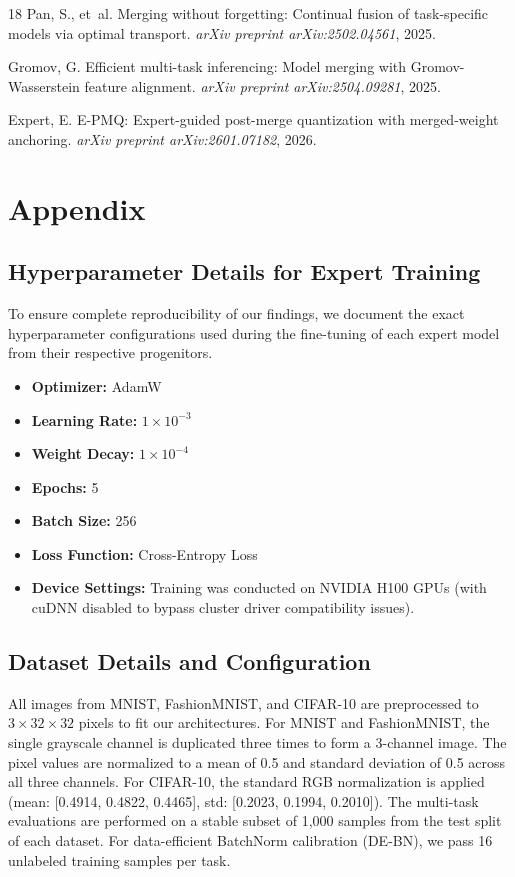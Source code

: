 \documentclass{article}
\theoremstyle{plain}
\theoremstyle{definition}
\theoremstyle{remark}
\begin{document}
\begin{thebibliography}{18}
Pan, S., et~al.
\newblock Merging without forgetting: Continual fusion of task-specific models via optimal transport.
\newblock \emph{arXiv preprint arXiv:2502.04561}, 2025.

Gromov, G.
\newblock Efficient multi-task inferencing: Model merging with Gromov-Wasserstein feature alignment.
\newblock \emph{arXiv preprint arXiv:2504.09281}, 2025.

Expert, E.
\newblock E-PMQ: Expert-guided post-merge quantization with merged-weight anchoring.
\newblock \emph{arXiv preprint arXiv:2601.07182}, 2026.

\end{thebibliography}

\clearpage
\appendix
\section{Appendix}

\subsection{Hyperparameter Details for Expert Training}
To ensure complete reproducibility of our findings, we document the exact hyperparameter configurations used during the fine-tuning of each expert model from their respective progenitors.
\begin{itemize}
    \item \textbf{Optimizer:} AdamW
    \item \textbf{Learning Rate:} $1 \times 10^{-3}$
    \item \textbf{Weight Decay:} $1 \times 10^{-4}$
    \item \textbf{Epochs:} 5
    \item \textbf{Batch Size:} 256
    \item \textbf{Loss Function:} Cross-Entropy Loss
    \item \textbf{Device Settings:} Training was conducted on NVIDIA H100 GPUs (with cuDNN disabled to bypass cluster driver compatibility issues).
\end{itemize}

\subsection{Dataset Details and Configuration}
All images from MNIST, FashionMNIST, and CIFAR-10 are preprocessed to $3 \times 32 \times 32$ pixels to fit our architectures.
For MNIST and FashionMNIST, the single grayscale channel is duplicated three times to form a 3-channel image. The pixel values are normalized to a mean of 0.5 and standard deviation of 0.5 across all three channels.
For CIFAR-10, the standard RGB normalization is applied (mean: [0.4914, 0.4822, 0.4465], std: [0.2023, 0.1994, 0.2010]).
The multi-task evaluations are performed on a stable subset of 1,000 samples from the test split of each dataset. For data-efficient BatchNorm calibration (DE-BN), we pass 16 unlabeled training samples per task.
\end{document}
